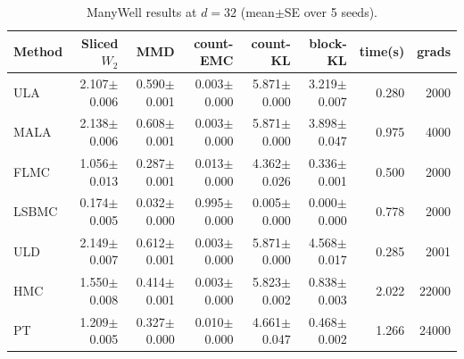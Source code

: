 \begin{table}[t]
\centering
\small
\caption{ManyWell results at $d=32$ (mean$\pm$SE over 5 seeds).}
\label{tab:manywell_d32}
\begin{tabular}{lrrrrrrr}
\toprule
Method & Sliced $W_2$ & MMD & count-EMC & count-KL & block-KL & time(s) & grads \\
\midrule
ULA & 2.107$\pm$0.006 & 0.590$\pm$0.001 & 0.003$\pm$0.000 & 5.871$\pm$0.000 & 3.219$\pm$0.007 & 0.280 & 2000 \\
MALA & 2.138$\pm$0.006 & 0.608$\pm$0.001 & 0.003$\pm$0.000 & 5.871$\pm$0.000 & 3.898$\pm$0.047 & 0.975 & 4000 \\
FLMC & 1.056$\pm$0.013 & 0.287$\pm$0.001 & 0.013$\pm$0.000 & 4.362$\pm$0.026 & 0.336$\pm$0.001 & 0.500 & 2000 \\
LSBMC & 0.174$\pm$0.005 & 0.032$\pm$0.000 & 0.995$\pm$0.000 & 0.005$\pm$0.000 & 0.000$\pm$0.000 & 0.778 & 2000 \\
ULD & 2.149$\pm$0.007 & 0.612$\pm$0.001 & 0.003$\pm$0.000 & 5.871$\pm$0.000 & 4.568$\pm$0.017 & 0.285 & 2001 \\
HMC & 1.550$\pm$0.008 & 0.414$\pm$0.001 & 0.003$\pm$0.000 & 5.823$\pm$0.002 & 0.838$\pm$0.003 & 2.022 & 22000 \\
PT & 1.209$\pm$0.005 & 0.327$\pm$0.000 & 0.010$\pm$0.000 & 4.661$\pm$0.047 & 0.468$\pm$0.002 & 1.266 & 24000 \\
\bottomrule
\end{tabular}
\end{table}